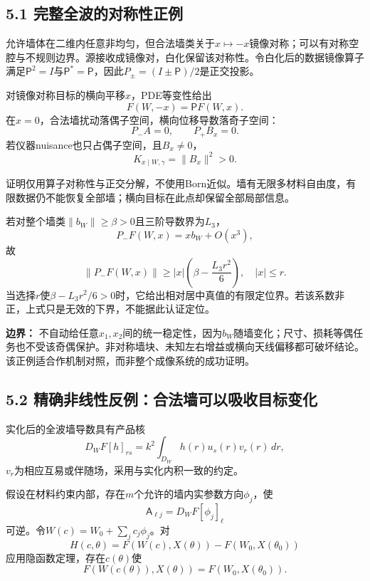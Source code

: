 \documentclass[
  10pt,
  a4paper,
]{article}
\begin{document}
\hypertarget{ux5b8cux6574ux5168ux6ce2ux7684ux5bf9ux79f0ux6027ux6b63ux4f8b}{%
\subsection{5.1
完整全波的对称性正例}\label{ux5b8cux6574ux5168ux6ce2ux7684ux5bf9ux79f0ux6027ux6b63ux4f8b}}

允许墙体在二维内任意非均匀，但合法墙类关于\(x\mapsto-x\)镜像对称；可以有对称空腔与不规则边界。源接收成镜像对，白化保留该对称性。令白化后的数据镜像算子满足\(\mathsf P^2=I\)与\(\mathsf P^*=\mathsf P\)，因此\(P_\pm=(I\pm\mathsf P)/2\)是正交投影。

对镜像对称目标的横向平移\(x\)，PDE等变性给出 \[
F(W,-x)=\mathsf P F(W,x).
\] 在\(x=0\)，合法墙扰动落偶子空间，横向位移导数落奇子空间： \[
P_-A=0,\qquad P_+B_x=0.
\] 若仪器nuisance也只占偶子空间，且\(B_x\ne0\)， \[
\boxed{
K_{x\mid W,\gamma}=\|B_x\|^2>0.
}
\]

证明仅用算子对称性与正交分解，不使用Born近似。墙有无限多材料自由度，有限数据仍不能恢复全部墙；横向目标在此点却保留全部局部信息。

若对整个墙类\(\|b_W\|\ge\beta>0\)且三阶导数界为\(L_3\)， \[
P_-F(W,x)=x b_W+O(x^3),
\] 故 \[
\|P_-F(W,x)\|\ge
|x|\left(\beta-\frac{L_3r^2}{6}\right),\quad |x|\le r.
\]
当选择\(r\)使\(\beta-L_3r^2/6>0\)时，它给出相对居中真值的有限定位界。若该系数非正，上式只是无效的下界，不能据此认证定位。

\textbf{边界：}
不自动给任意\(x_1,x_2\)间的统一稳定性，因为\(b_W\)随墙变化；尺寸、损耗等偶任务也不受该奇偶保护。非对称墙块、未知左右增益或横向天线偏移都可破坏结论。该正例适合作机制对照，而非整个成像系统的成功证明。

\hypertarget{ux7cbeux786eux975eux7ebfux6027ux53cdux4f8bux5408ux6cd5ux5899ux53efux4ee5ux5438ux6536ux76eeux6807ux53d8ux5316}{%
\subsection{5.2
精确非线性反例：合法墙可以吸收目标变化}\label{ux7cbeux786eux975eux7ebfux6027ux53cdux4f8bux5408ux6cd5ux5899ux53efux4ee5ux5438ux6536ux76eeux6807ux53d8ux5316}}

实化后的全波墙导数具有产品核 \[
D_WF[h]_{rs}=k^2\int_{D_W}h(r)u_s(r)v_r(r)\,dr,
\] \(v_r\)为相应互易或伴随场，采用与实化内积一致的约定。

假设在材料约束内部，存在\(m\)个允许的墙内实参数方向\(\phi_j\)，使 \[
\mathsf A_{\ell j}=D_WF[\phi_j]_\ell
\] 可逆。令\(W(c)=W_0+\sum_jc_j\phi_j\)。对 \[
H(c,\theta)=F(W(c),X(\theta))-F(W_0,X(\theta_0))
\] 应用隐函数定理，存在\(c(\theta)\)使 \[
\boxed{F(W(c(\theta)),X(\theta))=F(W_0,X(\theta_0)).}
\]
\end{document}
